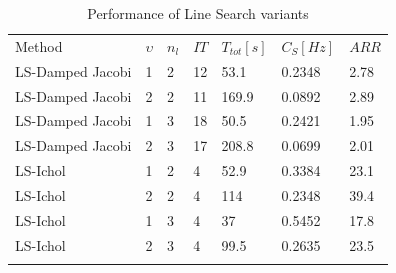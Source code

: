                         \begin{table}[h!]
                        \caption{Performance of Line Search variants}
                        \label{tab:1.1}       %
                        \centering
                        \begin{tabular}{lllllll}
                        \hline\noalign{\smallskip}
                        Method & $\upsilon$ & $n_l$ & $IT$ & $T_{tot} [s]$ & $C_S [Hz]$ & $ARR$\\
                        \noalign{\smallskip}\hline\noalign{\smallskip}
                        LS-Damped Jacobi & 1 & 2 & 12 & 53.1 & 0.2348 & 2.78 \\
                        LS-Damped Jacobi & 2 & 2 & 11 & 169.9 & 0.0892 & 2.89 \\
                        LS-Damped Jacobi & 1 & 3 & 18 & 50.5 & 0.2421 & 1.95 \\
                        LS-Damped Jacobi & 2 & 3 & 17 & 208.8 & 0.0699 & 2.01 \\
						LS-Ichol & 1 & 2 & 4 & 52.9 & 0.3384 & 23.1 \\
                        LS-Ichol & 2 & 2 & 4 & 114 & 0.2348 & 39.4 \\
                        LS-Ichol & 1 & 3 & 4 & 37 & 0.5452 & 17.8 \\
                        LS-Ichol & 2 & 3 & 4 & 99.5 & 0.2635 & 23.5 \\
                        \noalign{\smallskip}\hline
                        \end{tabular}
                        \end{table}
